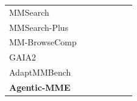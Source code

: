 \documentclass[runningheads]{llncs}
\theoremstyle{plain}
\theoremstyle{definition}
\theoremstyle{remark}
\newcommand{\cmark}{\textcolor{mygreen}{\ding{51}}}
\newcommand{\xmark}{\textcolor{myred!70}{\ding{55}}}
\newcommand{\pmark}{\textcolor{orange}{\ding{108}}}
\begin{document}
\begin{table}[t]
{\begin{tabular}{lcccccc}
MMSearch \cite{jiang2024mmsearch}   & \xmark & \cmark & \xmark & \xmark & \xmark & \xmark \\


\rowcolor{zebra}
MMSearch-Plus \cite{tao2025mmsearch}& \pmark & \cmark & \xmark & \xmark & \xmark & \cmark \\


MM-BrowseComp \cite{li2025mm}       & \xmark & \cmark & \cmark & \xmark & \xmark & \cmark \\

\rowcolor{zebra}
GAIA2 \cite{froger2026gaia2}        & \xmark & \pmark & \cmark & \xmark & \cmark & \xmark \\

AdaptMMBench \cite{zhang2026adaptmmbench} & \cmark & \xmark & \cmark & \xmark & \pmark & \cmark \\
\midrule

\rowcolor{rowhighlight} 
\textbf{Agentic-MME}                     & \cmark & \cmark & \cmark & \cmark & \cmark & \cmark \\
\bottomrule
\end{tabular}%
}
\vspace{-4mm}
\end{table}
\end{document}
